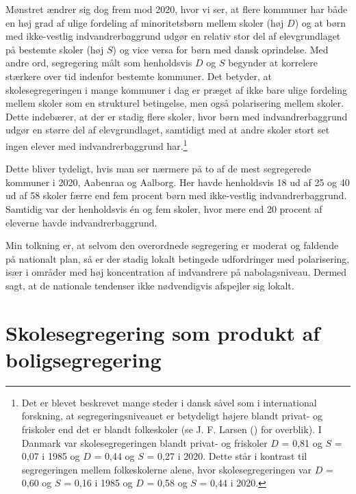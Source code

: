 \documentclass[
]{book}
\begin{document}
\newpage

Mønstret ændrer sig dog frem mod 2020, hvor vi ser, at flere kommuner har både en høj grad af ulige fordeling af minoritetsbørn mellem skoler (høj \(D\)) og at børn med ikke-vestlig indvandrerbaggrund udgør en relativ stor del af elevgrundlaget på bestemte skoler (høj \(S\)) og vice versa for børn med dansk oprindelse. Med andre ord, segregering målt som henholdsvis \(D\) og \(S\) begynder at korrelere stærkere over tid indenfor bestemte kommuner. Det betyder, at skolesegregeringen i mange kommuner i dag er præget af ikke bare ulige fordeling mellem skoler som en strukturel betingelse, men også polarisering mellem skoler. Dette indebærer, at der er stadig flere skoler, hvor børn med indvandrerbaggrund udgør en større del af elevgrundlaget, samtidigt med at andre skoler stort set ingen elever med indvandrerbaggrund har.\footnote{Det er blevet beskrevet mange steder i dansk såvel som i international forskning, at segregeringsniveauet er betydeligt højere blandt privat- og friskoler end det er blandt folkeskoler (se J. F. Larsen () for overblik). I Danmark var skolesegregeringen blandt privat- og friskoler \(D\) = 0,81 og \(S\) = 0,07 i 1985 og \(D\) = 0,44 og \(S\) = 0,27 i 2020. Dette står i kontrast til segregeringen mellem folkeskolerne alene, hvor skolesegregeringen var \(D\) = 0,60 og \(S\) = 0,16 i 1985 og \(D\) = 0,58 og \(S\) = 0,44 i 2020.}

Dette bliver tydeligt, hvis man ser nærmere på to af de mest segregerede kommuner i 2020, Aabenraa og Aalborg. Her havde henholdsvis 18 ud af 25 og 40 ud af 58 skoler færre end fem procent børn med ikke-vestlig indvandrerbaggrund. Samtidig var der henholdsvis én og fem skoler, hvor mere end 20 procent af eleverne havde indvandrerbaggrund.

Min tolkning er, at selvom den overordnede segregering er moderat og faldende på nationalt plan, så er der stadig lokalt betingede udfordringer med polarisering, især i områder med høj koncentration af indvandrere på nabolagsniveau. Dermed sagt, at de nationale tendenser ikke nødvendigvis afspejler sig lokalt.

\section{Skolesegregering som produkt af boligsegregering}\label{skolesegregering-som-produkt-af-boligsegregering}
\end{document}
